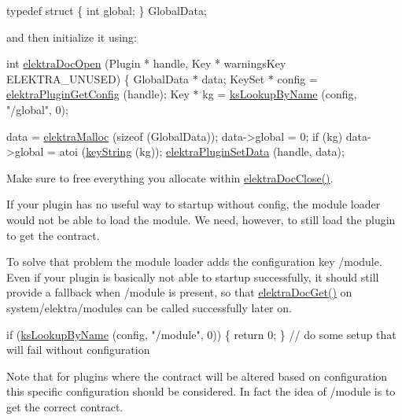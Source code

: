 \begin{DoxyCodeInclude}
\textcolor{keyword}{typedef} \textcolor{keyword}{struct}
\{
        \textcolor{keywordtype}{int} global;
\} GlobalData;
\end{DoxyCodeInclude}
 and then initialize it using\+:


\begin{DoxyCodeInclude}
\textcolor{keywordtype}{int} \hyperlink{group__plugin_ga23c2eb3584e38a4d494eb8f91e5e3d8d}{elektraDocOpen} (Plugin * handle, Key * warningsKey ELEKTRA\_UNUSED)
\{
        GlobalData * data;
        KeySet * config = \hyperlink{group__plugin_ga644bead796506c172817724051c977c9}{elektraPluginGetConfig} (handle);
        Key * kg = \hyperlink{group__keyset_gad2e30fb6d4739d917c5abb2ac2f9c1a1}{ksLookupByName} (config, \textcolor{stringliteral}{"/global"}, 0);

        data = \hyperlink{internal_8c_a35cdc2e5caed3454cb73b4fc7f37858c}{elektraMalloc} (\textcolor{keyword}{sizeof} (GlobalData));
        data->global = 0;
        \textcolor{keywordflow}{if} (kg) data->global = atoi (\hyperlink{group__keyvalue_ga880936f2481d28e6e2acbe7486a21d05}{keyString} (kg));
        \hyperlink{group__plugin_gaf4b941a52ff55d0ca2a9158d90208ef2}{elektraPluginSetData} (handle, data);
\end{DoxyCodeInclude}
 Make sure to free everything you allocate within \hyperlink{group__plugin_ga1236aefe5b2baf8b7bf636ba5aa9ea29}{elektra\+Doc\+Close()}.

If your plugin has no useful way to startup without config, the module loader would not be able to load the module. We need, however, to still load the plugin to get the contract.

To solve that problem the module loader adds the configuration key /module. Even if your plugin is basically not able to startup successfully, it should still provide a fallback when /module is present, so that \hyperlink{group__plugin_gacb69f3441c6d84241b4362f958fbe313}{elektra\+Doc\+Get()} on system/elektra/modules can be called successfully later on.


\begin{DoxyCodeInclude}
        \textcolor{keywordflow}{if} (\hyperlink{group__keyset_gad2e30fb6d4739d917c5abb2ac2f9c1a1}{ksLookupByName} (config, \textcolor{stringliteral}{"/module"}, 0))
        \{
                \textcolor{keywordflow}{return} 0;
        \}
        \textcolor{comment}{// do some setup that will fail without configuration}
\end{DoxyCodeInclude}
 Note that for plugins where the contract will be altered based on configuration this specific configuration should be considered. In fact the idea of /module is to get the correct contract.



